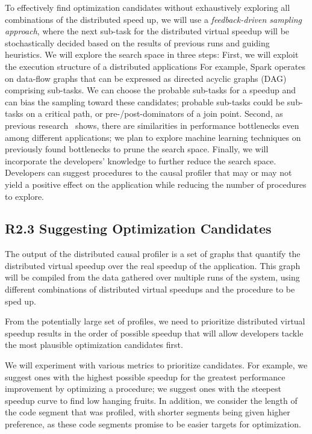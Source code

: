 To effectively find optimization candidates without exhaustively
exploring all combinations of the distributed speed up, we will
use a {\em feedback-driven sampling approach}, where the next sub-task
for the distributed virtual speedup will be stochastically decided
based on the results of previous runs and guiding
heuristics. We will explore the search space in three steps:
%
First, we will exploit the execution structure of a distributed
applications For example, Spark operates on data-flow graphs that can
be expressed as directed acyclic graphs (DAG) comprising
sub-tasks. We can choose the probable sub-tasks for a speedup and can
bias the sampling toward these candidates; probable sub-tasks could be
sub-tasks on a critical path, or pre-/post-dominators of a join point.
%
Second, as previous research~\cite{altman:oopsla10} shows, there are
similarities in performance bottlenecks even among different
applications; we plan to explore machine learning techniques on
previously found bottlenecks to prune the search space.
%
Finally, we will incorporate the developers' knowledge to further
reduce the search space. Developers can suggest procedures to the
causal profiler that may or may not yield a positive effect
on the application while reducing the number of procedures to explore.


\subsection{R2.3 Suggesting Optimization Candidates}
\label{sub:suggest}
The output of the distributed causal profiler is a set of graphs that
quantify the distributed virtual speedup over the real speedup of
the application. This graph will be compiled from the data gathered
over multiple runs of the system, using different combinations of
distributed virtual speedups and the procedure to be sped up.

\boxbeg
\begin{Challenge}
  From the potentially large set of profiles, we need to prioritize
  distributed virtual speedup results in the order of possible speedup
  that will allow developers tackle the most plausible optimization
  candidates first.
\end{Challenge}
\boxend

We will experiment with various metrics to prioritize candidates. For
example, we suggest ones with the highest possible speedup for the
greatest performance improvement by optimizing a procedure; we suggest ones
with the steepest speedup curve to find low hanging fruits. In addition,
we consider the length of the code segment that was profiled, with
shorter segments being given higher preference, as these code segments
promise to be easier targets for optimization.
